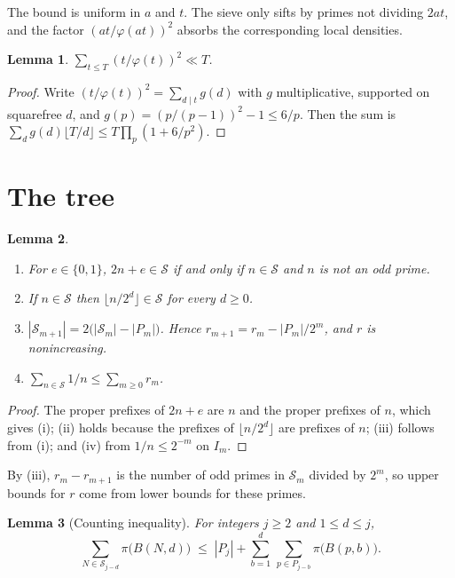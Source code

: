 \documentclass[11pt]{amsart}
\newtheorem{lemma}{Lemma}[section]
\newcommand{\Sset}{\mathcal{S}}
\begin{document}
The bound is uniform in $a$ and $t$. The sieve only sifts by primes not
dividing $2at$, and the factor $(at/\varphi(at))^2$ absorbs the
corresponding local densities.

\begin{lemma}
\label{lem:totient}
$\sum_{t \le T} (t/\varphi(t))^2 \ll T$.
\end{lemma}

\begin{proof}
Write $(t/\varphi(t))^2 = \sum_{d \mid t} g(d)$ with $g$ multiplicative,
supported on squarefree $d$, and $g(p) = (p/(p-1))^2 - 1 \le 6/p$. Then the
sum is $\sum_d g(d) \lfloor T/d \rfloor \le T \prod_p (1 + 6/p^2)$.
\end{proof}

\section{The tree}

\begin{lemma}
\label{lem:tree}
\begin{enumerate}
\item[(i)] For $e \in \{0, 1\}$, $2n+e \in \Sset$ if and only if $n \in \Sset$
and $n$ is not an odd prime.
\item[(ii)] If $n \in \Sset$ then $\lfloor n/2^d \rfloor \in \Sset$ for
every $d \ge 0$.
\item[(iii)] $|\Sset_{m+1}| = 2\bigl(|\Sset_m| - |P_m|\bigr)$. Hence
$r_{m+1} = r_m - |P_m|/2^m$, and $r$ is nonincreasing.
\item[(iv)] $\sum_{n \in \Sset} 1/n \le \sum_{m \ge 0} r_m$.
\end{enumerate}
\end{lemma}

\begin{proof}
The proper prefixes of $2n+e$ are $n$ and the proper prefixes of $n$,
which gives (i); (ii) holds because the prefixes of $\lfloor n/2^d\rfloor$
are prefixes of $n$; (iii) follows from (i); and (iv) from
$1/n \le 2^{-m}$ on $I_m$.
\end{proof}

By (iii), $r_m - r_{m+1}$ is the number of odd primes in $\Sset_m$
divided by $2^m$, so upper bounds for $r$ come from lower bounds for these
primes.

\begin{lemma}[Counting inequality]
\label{lem:count}
For integers $j \ge 2$ and $1 \le d \le j$,
\[
\sum_{N \in \Sset_{j-d}} \pi\bigl(B(N, d)\bigr)
\;\le\; |P_j| + \sum_{b=1}^{d}\, \sum_{p \in P_{j-b}} \pi\bigl(B(p, b)\bigr).
\]
\end{lemma}
\end{document}
